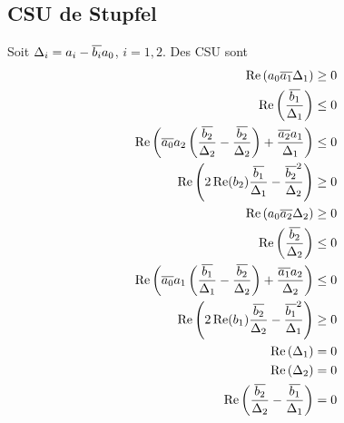 

\subsection{CSU de Stupfel}

  \begin{prop}
    Soit \(\Delta_i = a_i-{\overline{b_i}}a_0\), \(i=1,2\). Des CSU sont
    \begin{align}
      \operatorname{Re}\left(a_0{\overline{a_1}}\Delta_1\right) \ge 0 \\
      \operatorname{Re}\left(\dfrac{{\overline{b_1}}}{\Delta_1}\right) \le 0 \\
      \operatorname{Re}\left({\overline{a_0}}a_2\left(\dfrac{{\overline{b_2}}}{\Delta_2}-\dfrac{{\overline{b_2}}}{\Delta_2}\right) + \dfrac{{\overline{a_2}}a_1}{\Delta_1} \right)\le 0\\
      \operatorname{Re}\left(2\operatorname{Re}(b_2)\dfrac{{\overline{b_1}}}{\Delta_1}-\dfrac{{\overline{b_2}}^2}{\Delta_2}\right) \ge 0\\
      \operatorname{Re}\left(a_0{\overline{a_2}}\Delta_2\right) \ge 0 \\
      \operatorname{Re}\left(\dfrac{{\overline{b_2}}}{\Delta_2}\right) \le 0 \\
      \operatorname{Re}\left({\overline{a_0}}a_1\left(\dfrac{{\overline{b_1}}}{\Delta_1}-\dfrac{{\overline{b_2}}}{\Delta_2}\right) + \dfrac{{\overline{a_1}}a_2}{\Delta_2} \right)\le 0\\
      \operatorname{Re}\left(2\operatorname{Re}(b_1)\dfrac{{\overline{b_2}}}{\Delta_2}-\dfrac{{\overline{b_1}}^2}{\Delta_1}\right) \ge 0\\
      \operatorname{Re}\left(\Delta_1\right) = 0 \\
      \operatorname{Re}\left(\Delta_2\right) = 0 \\
      \operatorname{Re}\left(\dfrac{{\overline{b_2}}}{\Delta_2}-\dfrac{{\overline{b_1}}}{\Delta_1}\right) = 0
    \end{align}
  \end{prop}
  
